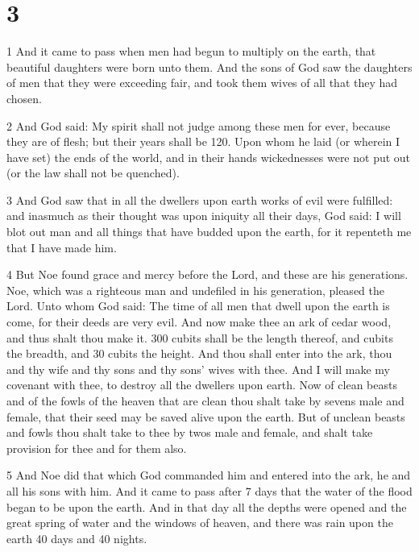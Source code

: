 \chapter{3}

\par 1 And it came to pass when men had begun to multiply on the earth, that beautiful daughters were born unto them. And the sons of God saw the daughters of men that they were exceeding fair, and took them wives of all that they had chosen. 

\par 2 And God said: My spirit shall not judge among these men for ever, because they are of flesh; but their years shall be 120. Upon whom he laid (or wherein I have set) the ends of the world, and in their hands wickednesses were not put out (or the law shall not be quenched). 

\par 3 And God saw that in all the dwellers upon earth works of evil were fulfilled: and inasmuch as their thought was upon iniquity all their days, God said: I will blot out man and all things that have budded upon the earth, for it repenteth me that I have made him.

\par 4 But Noe found grace and mercy before the Lord, and these are his generations. Noe, which was a righteous man and undefiled in his generation, pleased the Lord. Unto whom God said: The time of all men that dwell upon the earth is come, for their deeds are very evil. And now make thee an ark of cedar wood, and thus shalt thou make it. 300 cubits shall be the length thereof, and cubits the breadth, and 30 cubits the height. And thou shall enter into the ark, thou and thy wife and thy sons and thy sons' wives with thee. And I will make my covenant with thee, to destroy all the dwellers upon earth. Now of clean beasts and of the fowls of the heaven that are clean thou shalt take by sevens male and female, that their seed may be saved alive upon the earth. But of unclean beasts and fowls thou shalt take to thee by twos male and female, and shalt take provision for thee and for them also.

\par 5 And Noe did that which God commanded him and entered into the ark, he and all his sons with him. And it came to pass after 7 days that the water of the flood began to be upon the earth. And in that day all the depths were opened and the great spring of water and the windows of heaven, and there was rain upon the earth 40 days and 40 nights.


